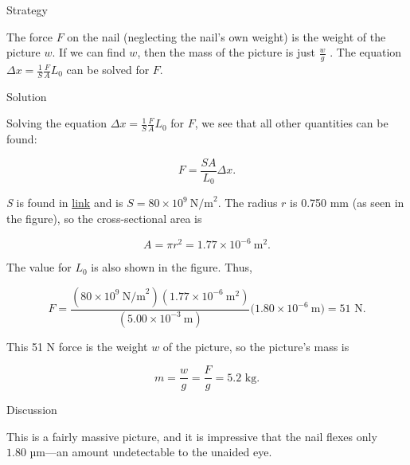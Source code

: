 \documentclass[
]{book}
\newenvironment{tinysection}{}{}
\begin{document}
\begin{tinysection}

{Strategy}

\end{tinysection}

The force \(F{}\) on the nail (neglecting the nail's own weight) is the
weight of the picture \(w{}\). If we can find \(w{}\), then the mass of the
picture is just \(\frac{w}{g}{}\) . The equation
\({{\Delta x = \frac{1}{S}}\frac{F}{A}L_{0}}{}\) can be solved for \(F{}\).

\begin{tinysection}

{Solution}

\end{tinysection}

Solving the equation \({{\Delta x = \frac{1}{S}}\frac{F}{A}L_{0}}{}\) for
\(F\), we see that all other quantities can be found:

\leavevmode\hypertarget{eip-458}{}%
\[{{{F = \frac{SA}{L_{0}}}\Delta x}.}{}\]

\emph{S} is found in
\protect\hyperlink{import-auto-id1165298671576}{link} and is
\({{S = {\text{80} \times \text{10}^{9}}}\ \text{N/m}^{2}}{}\). The radius
\(r{}\) is 0.750 mm (as seen in the figure), so the cross-sectional area
is

\leavevmode\hypertarget{eip-365}{}%
\[{{{{A = {\pi r}^{2}} = 1}\text{.}{\text{77} \times \text{10}^{- 6}}\ \text{m}^{2}}.}{}\]

The value for \(L_{0}{}\) is also shown in the figure. Thus,

\leavevmode\hypertarget{eip-736}{}%
\[{{F = {\frac{({\text{80} \times \text{10}^{9}}\ \text{N/m}^{2})(1\text{.}{\text{77} \times \text{10}^{- 6}\ }\text{m}^{2})}{(5\text{.}{\text{00} \times \text{10}^{- 3}\ }\text{m})}(}}1\text{.}{\text{80} \times \text{10}^{- 6}}\ \text{m}) = \text{51\ N.}}{}\]

This 51 N force is the weight \(w\) of the picture, so the picture's mass
is

\leavevmode\hypertarget{eip-147}{}%
\[{{{{{m = \frac{w}{g}} = \frac{F}{g}} = 5}\text{.2\ kg}}.}{}\]

\begin{tinysection}

{Discussion}

\end{tinysection}

This is a fairly massive picture, and it is impressive that the nail
flexes only \(\text{1.80\ µm}\)---an amount undetectable to the unaided
eye.
\end{document}
